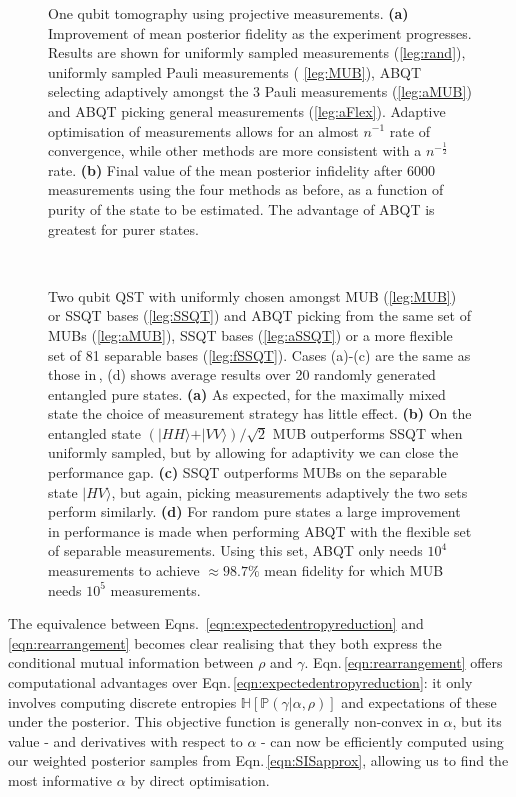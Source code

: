 \documentclass[aps,twocolumn,prl]{revtex4-1}
\newcommand{\param}{{\rho}} \newcommand{\data}{\mathcal{D}}
\newcommand{\config}{\alpha} \newcommand{\configset}{\mathcal{A}}
\newcommand{\outcome}{\gamma} \newcommand{\ie}{i.\,e.\ }
\begin{document}
\begin{figure}

\caption{One qubit tomography using projective measurements. \textbf{(a)}  Improvement of mean posterior fidelity as the experiment progresses. Results are shown for uniformly sampled measurements (\ref{leg:rand}), uniformly sampled Pauli measurements ( \ref{leg:MUB}), ABQT selecting adaptively amongst the 3 Pauli measurements (\ref{leg:aMUB}) and ABQT picking general measurements (\ref{leg:aFlex}). Adaptive optimisation of measurements allows for an almost $n^{-1}$ rate of convergence, while other methods are more consistent with a $n^{-\frac{1}{2}}$ rate. \textbf{(b)}  Final value of the mean posterior infidelity after 6000 measurements using the four methods as before, as a function of purity of the state to be estimated. The advantage of ABQT is greatest for purer states. \label{fig:qubit_results}}
\end{figure}

\begin{figure}[th]



\\
\caption{Two qubit QST with uniformly chosen amongst MUB (\ref{leg:MUB}) or SSQT bases (\ref{leg:SSQT}) and ABQT picking from the same set of MUBs (\ref{leg:aMUB}),  SSQT bases (\ref{leg:aSSQT}) or a more flexible set of 81 separable bases (\ref{leg:fSSQT}). Cases (a)-(c) are the same as those in\,\cite{MUBExperiment}, (d) shows average results over 20 randomly generated entangled pure states. \textbf{(a)} As expected, for the maximally mixed state the choice of measurement strategy has little effect. \textbf{(b)} On the entangled state $(\vert HH\rangle+\vert VV\rangle)/\sqrt{2}$ MUB outperforms SSQT when uniformly sampled, but by allowing for adaptivity we can close the performance gap. \textbf{(c)} SSQT outperforms MUBs on the separable state $\vert HV \rangle$, but again, picking measurements adaptively the two sets perform similarly. \textbf{(d)} For random pure states a large improvement in performance is made when performing ABQT with the flexible set of separable measurements. Using this set, ABQT only needs $10^4$ measurements to achieve $\approx98.7\%$ mean fidelity for which MUB needs $10^5$ measurements. \label{fig:two_qubit_results}}
\end{figure}

The equivalence between Eqns.\, \eqref{eqn:expectedentropyreduction} and \eqref{eqn:rearrangement} becomes clear realising that they both express the conditional mutual information between $\param$ and $\outcome$. Eqn.\,\eqref{eqn:rearrangement} offers computational advantages over Eqn.\,\eqref{eqn:expectedentropyreduction}: it only involves computing discrete entropies $\mathbb{H}\left[ \mathbb{P}(\outcome|\config,\param) \right]$ and expectations of these under the posterior. This objective function is generally non-convex in $\config$, but its value - and derivatives with respect to $\config$ - can now be efficiently computed using our weighted posterior samples from Eqn.\,\eqref{eqn:SISapprox}, allowing us to find the most informative $\config$ by direct optimisation.
\end{document}
